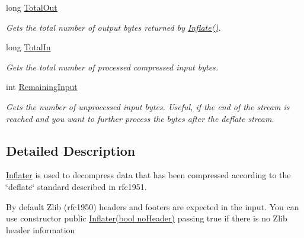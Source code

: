 \begin{DoxyCompactItemize}
long \hyperlink{class_i_c_sharp_code_1_1_sharp_zip_lib_1_1_zip_1_1_compression_1_1_inflater_a521be3f2a7835c37116298fcf732a058}{Total\+Out}
\begin{DoxyCompactList}\small\item\em Gets the total number of output bytes returned by \hyperlink{class_i_c_sharp_code_1_1_sharp_zip_lib_1_1_zip_1_1_compression_1_1_inflater_a73bfcbd5d20b4838bd28364fff12324e}{Inflate()}. \end{DoxyCompactList}\item 
long \hyperlink{class_i_c_sharp_code_1_1_sharp_zip_lib_1_1_zip_1_1_compression_1_1_inflater_af6d1546322fefbace3c87f4a62998073}{Total\+In}
\begin{DoxyCompactList}\small\item\em Gets the total number of processed compressed input bytes. \end{DoxyCompactList}\item 
int \hyperlink{class_i_c_sharp_code_1_1_sharp_zip_lib_1_1_zip_1_1_compression_1_1_inflater_a9b2f8ccdb35d861acb6c8d995f75d35e}{Remaining\+Input}
\begin{DoxyCompactList}\small\item\em Gets the number of unprocessed input bytes. Useful, if the end of the stream is reached and you want to further process the bytes after the deflate stream. \end{DoxyCompactList}\end{DoxyCompactItemize}


\subsection{Detailed Description}
\hyperlink{class_i_c_sharp_code_1_1_sharp_zip_lib_1_1_zip_1_1_compression_1_1_inflater}{Inflater} is used to decompress data that has been compressed according to the \char`\"{}deflate\char`\"{} standard described in rfc1951. 

By default Zlib (rfc1950) headers and footers are expected in the input. You can use constructor {\ttfamily  public \hyperlink{class_i_c_sharp_code_1_1_sharp_zip_lib_1_1_zip_1_1_compression_1_1_inflater_a89e97fe8e5522be57c2de110655fbefb}{Inflater(bool no\+Header)}} passing true if there is no Zlib header information

